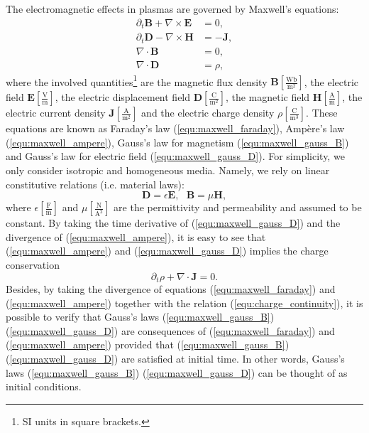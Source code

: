 \documentclass{article}
\begin{document}
The electromagnetic effects in plasmas are governed by Maxwell's equations:
\begin{subequations}
\begin{align}
    \partial_t \mathbf{B} + \nabla \times \mathbf{E} &= 0, \label{equ:maxwell_faraday} \\ 
    \partial_t \mathbf{D} - \nabla \times \mathbf{H} &= -\mathbf{J}, \label{equ:maxwell_ampere} \\
    \nabla \cdot \mathbf{B} &= 0,  \label{equ:maxwell_gauss_B}\\
    \nabla \cdot \mathbf{D} &= \rho, \label{equ:maxwell_gauss_D}
\end{align}
\end{subequations}
where the involved quantities\footnote{SI units in square brackets.} are the magnetic flux density $\mathbf{B}[\frac{\text{Wb}}{\text{m}^2}]$, the electric field $\mathbf{E}[\frac{\text{V}}{\text{m}}]$, the electric displacement field $\mathbf{D}[\frac{\text{C}}{\text{m}^2}]$, the magnetic field $\mathbf{H}[\frac{\text{A}}{\text{m}}]$, the electric current density $\mathbf{J}[\frac{\text{A}}{\text{m}^2}]$ and the electric charge density $\rho[\frac{\text{C}}{\text{m}^3}]$. These equations are known as Faraday's law (\ref{equ:maxwell_faraday}), Amp\`{e}re's law (\ref{equ:maxwell_ampere}), Gauss's law for magnetism (\ref{equ:maxwell_gauss_B}) and Gauss's law for electric field (\ref{equ:maxwell_gauss_D}). For simplicity, we only consider isotropic and homogeneous media. Namely, we rely on linear constitutive relations (i.e. material laws):
\begin{equation} \label{equ:material_law}
    \mathbf{D} = \epsilon \mathbf{E}, \ \ \ \mathbf{B} = \mu\mathbf{H}, 
\end{equation}
where $\epsilon[\frac{\text{F}}{\text{m}}]$ and $\mu[\frac{\text{N}}{\text{A}^{2}}]$ are the permittivity and permeability and assumed to be constant. By taking the time derivative of (\ref{equ:maxwell_gauss_D}) and the divergence of (\ref{equ:maxwell_ampere}), it is easy to see that (\ref{equ:maxwell_ampere}) and (\ref{equ:maxwell_gauss_D}) implies the charge conservation
\begin{equation} \label{equ:charge_continuity}
    \partial_t\rho + \nabla \cdot \mathbf{J} = 0.
\end{equation}
Besides, by taking the divergence of equations (\ref{equ:maxwell_faraday}) and (\ref{equ:maxwell_ampere}) together with the relation (\ref{equ:charge_continuity}), it is possible to verify that Gauss's laws (\ref{equ:maxwell_gauss_B}) (\ref{equ:maxwell_gauss_D}) are consequences of (\ref{equ:maxwell_faraday}) and (\ref{equ:maxwell_ampere}) provided that (\ref{equ:maxwell_gauss_B}) (\ref{equ:maxwell_gauss_D}) are satisfied at initial time. In other words, Gauss's laws (\ref{equ:maxwell_gauss_B}) (\ref{equ:maxwell_gauss_D}) can be thought of as initial conditions. 
\end{document}
